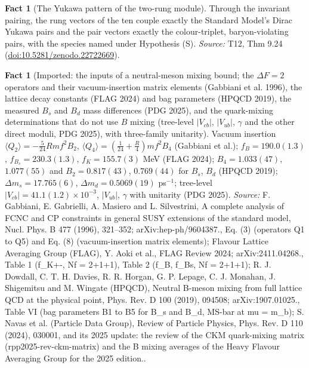 \documentclass[11pt]{article}
\theoremstyle{definition}
\newtheorem{fact}[theorem]{Fact}
\theoremstyle{plain}
\begin{document}
\begin{fact}[The Yukawa pattern of the two-rung module]\label{c:standard-model.yukawa-pattern-two-rung-module}
Through the invariant pairing, the rung vectors of the ten couple exactly the Standard Model's Dirac Yukawa pairs and the pair vectors exactly the colour-triplet, baryon-violating pairs, with the species named under Hypothesis (S).
\emph{Source:} T12, Thm 9.24 (\href{https://doi.org/10.5281/zenodo.22722669}{doi:10.5281/zenodo.22722669}).
\end{fact}

\begin{fact}[Imported: the inputs of a neutral-meson mixing bound; the $\Delta F = 2$ operators and their vacuum-insertion matrix elements (Gabbiani et al. 1996), the lattice decay constants (FLAG 2024) and bag parameters (HPQCD 2019), the measured $B_{s}$ and $B_{d}$ mass differences (PDG 2025), and the quark-mixing determinations that do not use $B$ mixing (tree-level $|V_{cb}|$, $|V_{ub}|$, $\gamma$ and the other direct moduli, PDG 2025), with three-family unitarity]\label{c:synthesis.imported-b-meson-mixing-inputs-vacuum-insertion-lattice-and-tree-level-quark-mixing}
Vacuum insertion $\langle Q_{2}\rangle = -\tfrac{5}{24}Rm f^{2}B_{2}$, $\langle Q_{4}\rangle = (\tfrac{1}{24} + \tfrac{R}{4})mf^{2}B_{4}$ (Gabbiani et al.); $f_{B} = 190.0(1.3)$, $f_{B_{s}} = 230.3(1.3)$, $f_{K} = 155.7(3)$ MeV (FLAG 2024); $B_{4} = 1.033(47)$, $1.077(55)$ and $B_{2} = 0.817(43)$, $0.769(44)$ for $B_{s}$, $B_{d}$ (HPQCD 2019); $\Delta m_{s} = 17.765(6)$, $\Delta m_{d} = 0.5069(19)$ ps$^{-1}$; tree-level $|V_{cb}| = 41.1(1.2) \times 10^{-3}$, $|V_{ub}|$, $\gamma$ with unitarity (PDG 2025).
\emph{Source:} F. Gabbiani, E. Gabrielli, A. Masiero and L. Silvestrini, A complete analysis of FCNC and CP constraints in general SUSY extensions of the standard model, Nucl. Phys. B 477 (1996), 321--352; arXiv:hep-ph/9604387., Eq. (3) (operators Q1 to Q5) and Eq. (8) (vacuum-insertion matrix elements); Flavour Lattice Averaging Group (FLAG), Y. Aoki et al., FLAG Review 2024; arXiv:2411.04268., Table 1 (f\_K+-, Nf = 2+1+1), Table 2 (f\_B, f\_Bs, Nf = 2+1+1); R. J. Dowdall, C. T. H. Davies, R. R. Horgan, G. P. Lepage, C. J. Monahan, J. Shigemitsu and M. Wingate (HPQCD), Neutral B-meson mixing from full lattice QCD at the physical point, Phys. Rev. D 100 (2019), 094508; arXiv:1907.01025., Table VI (bag parameters B1 to B5 for B\_s and B\_d, MS-bar at mu = m\_b); S. Navas et al. (Particle Data Group), Review of Particle Physics, Phys. Rev. D 110 (2024), 030001, and its 2025 update: the review of the CKM quark-mixing matrix (rpp2025-rev-ckm-matrix) and the B mixing averages of the Heavy Flavour Averaging Group for the 2025 edition..
\end{fact}
\end{document}
